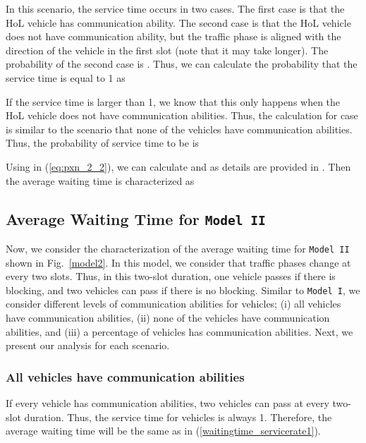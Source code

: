 \documentclass[conference]{IEEEtran}
\newcommand{\modelI}{{\tt{Model I}}}
\newcommand{\modelII}{{\tt{Model II}}}
\begin{document}
In this scenario, the service time  occurs in two cases. The first case is that the HoL vehicle has communication ability. The second case is that the HoL vehicle does not have communication ability, but the traffic phase is aligned with the direction of the vehicle in the first slot (note that it may take longer). The probability of the second case is . Thus, we can calculate the probability that the service time is equal to  1 as


If the service time is larger than 1, we know that this only happens when the HoL vehicle does not have communication abilities. Thus, the calculation for  case is similar to the scenario that none of the vehicles have communication abilities. Thus, the probability of service time to be  is
 
Using  in (\ref{eq:pxn_2_2}), we can calculate  and  as details are provided in \cite{this_tech}. Then the average waiting time is characterized as 





\vspace{-5pt}
\subsection{Average Waiting Time for \modelII}
Now, we consider the characterization of the average waiting time for \modelII~ shown in Fig.~\ref{model2}. In this model, we consider that traffic phases change at every two slots. Thus, in this two-slot duration, one vehicle passes if there is blocking, and two vehicles can pass if there is no blocking. Similar to \modelI, we consider different levels of communication abilities for vehicles; (i) all vehicles have communication abilities, (ii) none of the vehicles have communication abilities, and (iii) a percentage of vehicles has communication abilities. Next, we present our analysis for each scenario.

\subsubsection{All vehicles have communication abilities}\label{everycartellsmodel2}
If every vehicle has communication abilities, two vehicles can pass at every two-slot duration. Thus, the service time for vehicles is always 1. Therefore, the average waiting time will be the same as in (\ref{waitingtime_servicerate1}).
\end{document}
